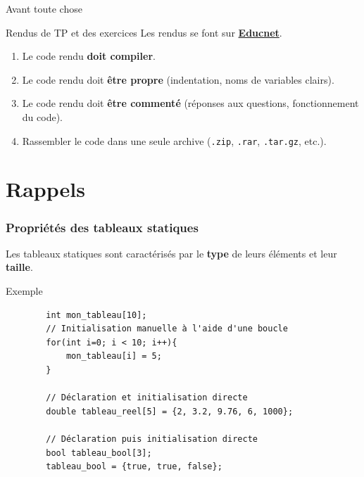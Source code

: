 
\subtitle{Les structures}
\date[6 oct. 2017]{Vendredi 6 octobre 2017}
\maketitle

\begin{frame}{Avant toute chose}
  \begin{alertblock}{Rendus de TP et des exercices}
  Les rendus se font sur \href{https://educnet.enpc.fr}{\textbf{Educnet}}.
  \begin{enumerate}
  	\item Le code rendu \textbf{doit compiler}.
    \item Le code rendu doit \textbf{être propre} (indentation, noms de variables clairs).
    \item Le code rendu doit \textbf{être commenté} (réponses aux questions, fonctionnement du code).
    \item Rassembler le code dans une seule archive (\texttt{.zip}, \texttt{.rar}, \texttt{.tar.gz}, etc.).
  \end{enumerate}
  \end{alertblock}

\end{frame}

\section{Rappels}


\begin{frame}[fragile=singleslide]
	\frametitle{Propriétés des tableaux statiques}
	Les tableaux statiques sont caractérisés par le \textbf{type} de leurs éléments et leur \textbf{taille}.
	
	\begin{exampleblock}{Exemple}
    \begin{verbatim}
		int mon_tableau[10];
		// Initialisation manuelle à l'aide d'une boucle
		for(int i=0; i < 10; i++){
        	mon_tableau[i] = 5;
		}

		// Déclaration et initialisation directe
		double tableau_reel[5] = {2, 3.2, 9.76, 6, 1000};

		// Déclaration puis initialisation directe
		bool tableau_bool[3];
		tableau_bool = {true, true, false};
    \end{verbatim}
	\end{exampleblock}
\end{frame}

